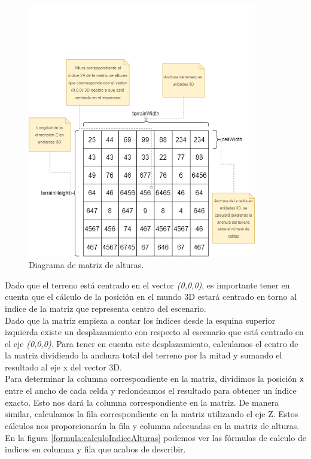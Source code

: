 \documentclass[a4paper, 11pt]{book}
\begin{document}
\begin{figure}[h]
  \centering
  \includegraphics[width=10cm, keepaspectratio]{img/terrain.drawio.png}
  \caption{Diagrama de matriz de alturas.}
  \label{fig:terrainDrawio}
\end{figure}
Dado que el terreno está centrado en el vector \emph{(0,0,0)}, es importante tener en cuenta que el cálculo de la posición en el mundo \textsc{3D} estará centrado en torno al indice de la matriz que representa centro del escenario.\\ 
Dado que la matriz empieza a contar los índices desde la esquina superior izquierda existe un desplazamiento con respecto al escenario que está centrado en el eje \emph{(0,0,0)}.
Para tener en cuenta este desplazamiento, calculamos el centro de la matriz dividiendo la anchura total del terreno por la mitad y sumando el resultado al eje x del vector 3D. \\
Para determinar la columna correspondiente en la matriz, dividimos la posición \texttt{x} entre el ancho de cada celda y redondeamos el resultado para obtener un índice exacto. Esto nos dará la columna correspondiente en la matriz. 
De manera similar, calculamos la fila correspondiente en la matriz utilizando el eje Z. Estos cálculos nos proporcionarán la fila y columna adecuadas en la matriz de alturas.
En la figura \ref{formula:calculoIndiceAlturas} podemos ver las fórmulas de calculo de indices en columna y fila que acabos de describir.
\end{document}

